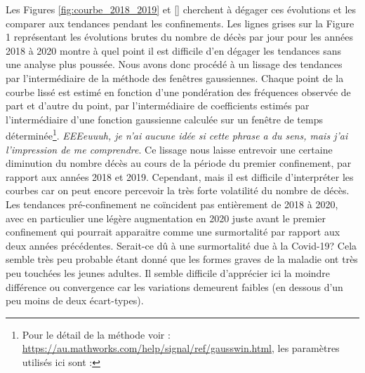 \documentclass[titlepage]{article}
\begin{document}
Les Figures \ref{fig:courbe_2018_2019} et \ref{} cherchent à dégager ces évolutions et les comparer aux tendances pendant les confinements. Les lignes grises sur la Figure 1 représentant les évolutions brutes du nombre de décès par jour pour les années 2018 à 2020 montre à quel point il est difficile d'en dégager les tendances sans une analyse plus poussée. Nous avons donc procédé à un lissage des tendances par l'intermédiaire de la méthode des fenêtres gaussiennes. Chaque point de la courbe lissé est estimé en fonction d'une pondération des fréquences observée de part et d'autre du point, par l'intermédiaire de coefficients estimés par l'intermédiaire d'une fonction gaussienne calculée sur un fenêtre de temps déterminée\footnote{Pour le détail de la méthode voir : \url{https://au.mathworks.com/help/signal/ref/gausswin.html}, les paramètres utilisés ici sont : }. \textit{EEEeuuuh, je n'ai aucune idée si cette phrase a du sens, mais j'ai l'impression de me comprendre}. Ce lissage nous laisse entrevoir une certaine diminution du nombre décès au cours de la période du premier confinement, par rapport aux années 2018 et 2019. Cependant, mais il est difficile d'interpréter les courbes car on peut encore percevoir la très forte volatilité du nombre de décès. Les tendances pré-confinement ne coïncident pas entièrement de 2018 à 2020, avec en particulier une légère augmentation en 2020 juste avant le premier confinement qui pourrait apparaitre comme une surmortalité par rapport aux deux années précédentes. Serait-ce dû à une surmortalité due à la Covid-19? Cela semble très peu probable étant donné que les formes graves de la maladie ont très peu touchées les jeunes adultes. Il semble difficile d'apprécier ici la moindre différence ou convergence car les variations demeurent faibles (en dessous d'un peu moins de deux écart-types). \\
\end{document}
